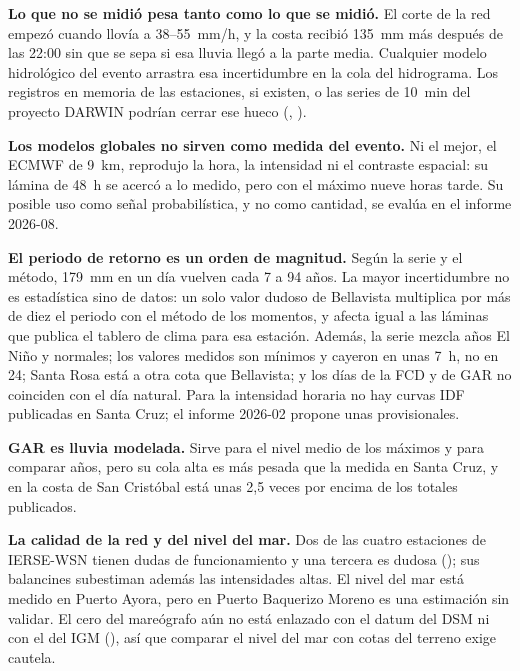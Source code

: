 \documentclass{sosg-informe}
\begin{document}
\textbf{Lo que no se midió pesa tanto como lo que se midió.} El corte de la red empezó cuando llovía a 38--55~mm/h, y la costa recibió 135~mm más después de las 22:00 sin que se sepa si esa lluvia llegó a la parte media. Cualquier modelo hidrológico del evento arrastra esa incertidumbre en la cola del hidrograma. Los registros en memoria de las estaciones, si existen, o las series de 10~min del proyecto DARWIN podrían cerrar ese hueco (, ).

\textbf{Los modelos globales no sirven como medida del evento.} Ni el mejor, el ECMWF de 9~km, reprodujo la hora, la intensidad ni el contraste espacial: su lámina de 48~h se acercó a lo medido, pero con el máximo nueve horas tarde. Su posible uso como señal probabilística, y no como cantidad, se evalúa en el informe 2026-08.

\textbf{El periodo de retorno es un orden de magnitud.} Según la serie y el método, 179~mm en un día vuelven cada 7 a 94 años. La mayor incertidumbre no es estadística sino de datos: un solo valor dudoso de Bellavista multiplica por más de diez el periodo con el método de los momentos, y afecta igual a las láminas que publica el tablero de clima para esa estación. Además, la serie mezcla años El Niño y normales; los valores medidos son mínimos y cayeron en unas 7~h, no en 24; Santa Rosa está a otra cota que Bellavista; y los días de la FCD y de GAR no coinciden con el día natural. Para la intensidad horaria no hay curvas IDF publicadas en Santa Cruz; el informe 2026-02 propone unas provisionales.

\textbf{GAR es lluvia modelada.} Sirve para el nivel medio de los máximos y para comparar años, pero su cola alta es más pesada que la medida en Santa Cruz, y en la costa de San Cristóbal está unas 2,5 veces por encima de los totales publicados.

\textbf{La calidad de la red y del nivel del mar.} Dos de las cuatro estaciones de IERSE-WSN tienen dudas de funcionamiento y una tercera es dudosa (); sus balancines subestiman además las intensidades altas. El nivel del mar está medido en Puerto Ayora, pero en Puerto Baquerizo Moreno es una estimación sin validar. El cero del mareógrafo aún no está enlazado con el datum del DSM ni con el del IGM (), así que comparar el nivel del mar con cotas del terreno exige cautela.

\end{document}
